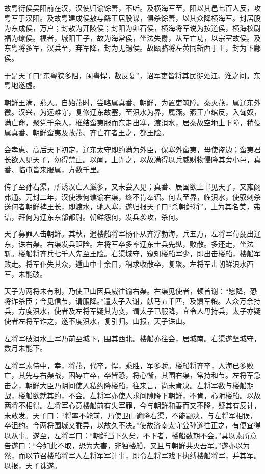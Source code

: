 \documentclass[12pt,UTF8]{ctexbook}
\begin{document}
故粤衍侯吴阳前在汉，汉使归谕馀善，不听。及横海军至，阳以其邑七百人反，攻粤军于汉阳。及故粤建成侯敖与繇王居股谋，俱杀馀善，以其众降横海军。封居股为东成侯，万户；封敖为开陵侯；封阳为卯石侯，横海将军说为按道侯，横海校尉福为缭侯。福者，城阳王子，故为海常侯，坐法失爵，从军亡功，以宗室故侯。及东粤将多军，汉兵至，弃军降，封为无锡侯。故瓯骆将左黄同斩西于王，封为下鄜侯。



于是天子曰“东粤狭多阻，闽粤悍，数反复”，诏军吏皆将其民徙处江、淮之间。东粤地遂虚。



朝鲜王满，燕人。自始燕时，尝略属真番、朝鲜，为置吏筑障。秦灭燕，属辽东外徼。汉兴，为远难守，复修辽东故塞，至浿水为界，属燕。燕王卢绾反，入匈奴，满亡命，聚党千余人，椎结蛮夷服而东走出塞，渡浿水，居秦故空地上下障，稍伇属真番、朝鲜蛮夷及故燕、齐亡在者王之，都王险。



会孝惠、高后天下初定，辽东太守即约满为外臣，保塞外蛮夷，毋使盗边；蛮夷君长欲入见天子，勿得禁止。以闻，上许之，以故满得以兵威财物侵降其旁小邑，真番、临屯皆来服属，方数千里。



传子至孙右渠，所诱汉亡人滋多，又未尝入见；真番、辰国欲上书见天子，又雍阏弗通。元封二年，汉使涉何谯谕右渠，终不肯奉诏。何去至界，临浿水，使驭刺杀送何者朝鲜裨王长，即渡水，驰入塞，遂归报天子曰“杀朝鲜将”。上为其名美，弗诘，拜何为辽东东部都尉。朝鲜怨何，发兵袭攻，杀何。



天子募罪人击朝鲜。其秋，遣楼船将军杨仆从齐浮勃海，兵五万，左将军荀彘出辽东，诛右渠。右渠发兵距险。左将军卒多率辽东士兵先纵，败散。多还走，坐法斩。楼船将齐兵七千人先至王险。右渠城守，窥知楼船军少，即出击楼船，楼船军败走。将军仆失其众，遁山中十余日，稍求收散卒，复聚。左将军击朝鲜浿水西军，未能破。



天子为两将未有利，乃使卫山因兵威往谕右渠。右渠见使者，顿首谢：“愿降，恐将诈杀臣；今见信节，请服降。”遣太子入谢，献马五千匹，及馈军粮。人众万余持兵，方度浿水，使者及左将军疑其为变，谓太子已服降，宜令人毋持兵，太子亦疑使者左将军诈之，遂不度浿水，复引归。山报，天子诛山。



左将军破浿水上军乃前至城下，围其西北。楼船亦往会，居城南。右渠遂坚城守，数月未能下。



左将军素侍中，幸，将燕，代卒，悍，乘胜，军多骄。楼船将齐卒，入海已多败亡，其先与右渠战，困辱亡卒，卒皆恐，将心惭，其围右渠，常持和节。左将军急击之，朝鲜大臣乃阴间使人私约降楼船，往来言，尚未肯决。左将军数与楼船期战，楼船欲就其约，不会。左将军亦使人求间隙降下朝鲜，不肯，心附楼船。以故两将不相得。左将军心意楼船前有失军罪，今与朝鲜和善而又不降，疑其有反计，未敢发。天子曰：“将率不能前，乃使卫山谕降右渠，不能颛决，与左将军相误，卒沮约。今两将围城又乖异，以故久不决。”使故济南太守公孙遂往正之，有便宜得以从事。遂至，左将军曰：“朝鲜当下久矣，不下者，楼船数期不会。”具以素所意告遂曰：“今如此不取，恐为大害，非独楼船，又且与朝鲜共灭吾军。”遂亦以为然，而以节召楼船将军入左将军军计事，即令左将军戏下执缚楼船将军，并其军。以报，天子诛遂。
\end{document}
